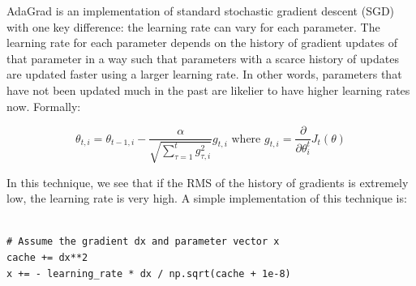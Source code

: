 \documentclass{tufte-handout}
\begin{document}
AdaGrad is an implementation of standard stochastic gradient descent (SGD) with one key difference: the learning rate can vary for each parameter. The learning rate for each parameter depends on the history of gradient updates of that parameter in a way such that parameters with a scarce history of updates are updated faster using a larger learning rate. In other words, parameters that have not been updated much in the past are likelier to have higher learning rates now. Formally:

$$\theta_{t,i} = \theta_{t-1,i}  - \frac{\alpha}{\sqrt{\sum_{\tau=1}^{t} g_{\tau , i}^2}} g_{t,i} \text{ where } g_{t,i} = \frac{\partial}{\partial \theta_i^t}J_t(\theta) $$

In this technique, we see that if the RMS of the history of gradients is extremely low, the learning rate is very high. A simple implementation of this technique is:
\begin{theorem}
\begin{verbatim}

# Assume the gradient dx and parameter vector x
cache += dx**2
x += - learning_rate * dx / np.sqrt(cache + 1e-8)
\end{verbatim}
\label{snip:adagrad}
\end{theorem}
\end{document}
